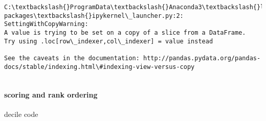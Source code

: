 \documentclass[11pt]{article}
\begin{document}
    \begin{Verbatim}[commandchars=\\\{\}]
C:\textbackslash{}ProgramData\textbackslash{}Anaconda3\textbackslash{}lib\textbackslash{}site-packages\textbackslash{}ipykernel\_launcher.py:2: SettingWithCopyWarning: 
A value is trying to be set on a copy of a slice from a DataFrame.
Try using .loc[row\_indexer,col\_indexer] = value instead

See the caveats in the documentation: http://pandas.pydata.org/pandas-docs/stable/indexing.html\#indexing-view-versus-copy
  

    \end{Verbatim}

    \paragraph{scoring and rank ordering}\label{scoring-and-rank-ordering}

    decile code
\end{document}
